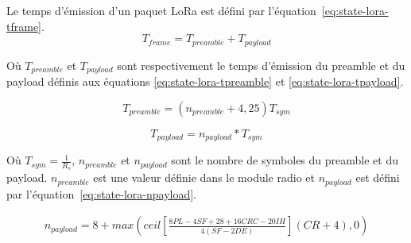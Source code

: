 Le temps d'émission d'un paquet LoRa est défini par l'équation~\ref{eq:state-lora-tframe}.
\begin{equation}\label{eq:state-lora-tframe}
    T_{frame} = T_{preamble} + T_{payload}
\end{equation}

Où $T_{preamble}$ et $T_{payload}$ sont respectivement le temps d'émission du preamble et du payload définis aux équations \ref{eq:state-lora-tpreamble} et \ref{eq:state-lora-tpayload}.

\begin{equation}\label{eq:state-lora-tpreamble}
    T_{preamble} = (n_{preamble} + 4,25)T_{sym}
\end{equation}

\begin{equation}\label{eq:state-lora-tpayload}
    T_{payload} = n_{payload} * T_{sym}
\end{equation}

Où $T_{sym} = \frac{1}{R_s}$, $n_{preamble}$ et $n_{payload}$ sont le nombre de symboles du preamble et du payload. $n_{preamble}$ est une valeur définie dans le module radio et $n_{payload}$ est défini par l'équation~\ref{eq:state-lora-npayload}.

\begin{equation}\label{eq:state-lora-npayload}
    \begin{split}
    n_{payload} =8 +max
     \left( ceil \left[ \frac{8PL - 4SF + 28 + 16CRC - 20IH}{4(SF-2DE)} \right] (CR+4), 0 \right)
    \end{split}
\end{equation}


